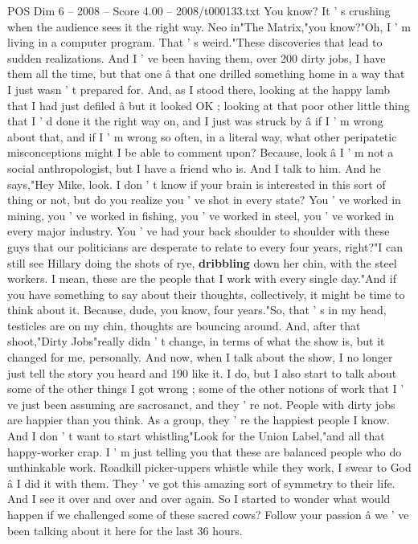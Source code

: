 \begin{textsample}{POS Dim 6 – 2008 – Score 4.00 – 2008/t000133.txt}
You know?
It ' s crushing when the audience sees it the right way.
Neo in"The Matrix,"you know?"Oh, I ' m living in a computer program.
That ' s weird."These discoveries that lead to sudden realizations.
And I ' ve been having them, over 200 dirty jobs, I have them all the time, but that one â that one drilled something home in a way that I just wasn ' t prepared for.
And, as I stood there, looking at the happy lamb that I had just defiled â but it looked OK ; looking at that poor other little thing that I ' d done it the right way on, and I just was struck by â if I ' m wrong about that, and if I ' m wrong so often, in a literal way, what other peripatetic misconceptions might I be able to comment upon?
Because, look â I ' m not a social anthropologist, but I have a friend who is.
And I talk to him.
And he says,"Hey Mike, look.
I don ' t know if your brain is interested in this sort of thing or not, but do you realize you ' ve shot in every state?
You ' ve worked in mining, you ' ve worked in fishing, you ' ve worked in steel, you ' ve worked in every major industry.
You ' ve had your back shoulder to shoulder with these guys that our politicians are desperate to relate to every four years, right?"I can still see Hillary doing the shots of rye, \textbf{dribbling} down her chin, with the steel workers.
I mean, these are the people that I work with every single day."And if you have something to say about their thoughts, collectively, it might be time to think about it.
Because, dude, you know, four years."So, that ' s in my head, testicles are on my chin, thoughts are bouncing around.
And, after that shoot,"Dirty Jobs"really didn ' t change, in terms of what the show is, but it changed for me, personally.
And now, when I talk about the show, I no longer just tell the story you heard and 190 like it.
I do, but I also start to talk about some of the other things I got wrong ; some of the other notions of work that I ' ve just been assuming are sacrosanct, and they ' re not.
People with dirty jobs are happier than you think.
As a group, they ' re the happiest people I know.
And I don ' t want to start whistling"Look for the Union Label,"and all that happy-worker crap.
I ' m just telling you that these are balanced people who do unthinkable work.
Roadkill picker-uppers whistle while they work, I swear to God â I did it with them.
They ' ve got this amazing sort of symmetry to their life.
And I see it over and over and over again.
So I started to wonder what would happen if we challenged some of these sacred cows?
Follow your passion â we ' ve been talking about it here for the last 36 hours.

\end{textsample}
